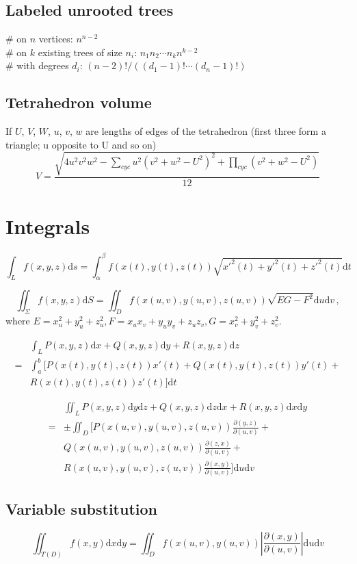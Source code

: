 	\subsection{Labeled unrooted trees}
		\# on $n$ vertices: $n^{n-2}$ \\
		\# on $k$ existing trees of size $n_i$: $n_1n_2\cdots n_k n^{k-2}$ \\
		\# with degrees $d_i$: $(n-2)! / ((d_1-1)! \cdots (d_n-1)!)$
	\subsection{Tetrahedron volume}
	If $U$, $V$, $W$, $u$, $v$, $w$ are lengths of edges of the tetrahedron (first three form a triangle; u opposite to U and so on)
	\[ V = \frac{\sqrt{ 4u^2v^2w^2 - \sum_{cyc}{u^2(v^2+w^2-U^2)^2} + \prod_{cyc}{(v^2+w^2-U^2)} }}{12} \]

\section{Integrals}
	$$\int_Lf(x,y,z)\mathrm{d}s=\int_\alpha^\beta f(x(t),y(t),z(t))\sqrt{x'^2(t)+y'^2(t)+z'^2(t)}\mathrm{d}t$$

	$$\iint_\Sigma f(x,y,z)\mathrm{d}S=\iint_D f(x(u,v),y(u,v),z(u,v))\sqrt{EG-F^2}\mathrm{d}u\mathrm{d}v\,,$$
	where $E=x_u^2+y_u^2+z_u^2,F=x_ux_v+y_uy_v+z_uz_v,G=x_v^2+y_v^2+z_v^2$.

	\begin{align*}
	&\int_L P(x,y,z)\mathrm{d}x+Q(x,y,z)\mathrm{d}y+R(x,y,z)\mathrm{d}z\\
	=&\int_a^b[P(x(t),y(t),z(t))x'(t)+Q(x(t),y(t),z(t))y'(t)+\\
	&R(x(t),y(t),z(t))z'(t)]\mathrm{d}t
	\end{align*}

	\begin{align*}
	&\iint_L P(x,y,z)\mathrm{d}y\mathrm{d}z+Q(x,y,z)\mathrm{d}z\mathrm{d}x+R(x,y,z)\mathrm{d}x\mathrm{d}y\\
	=&\pm \iint_D[P(x(u,v),y(u,v),z(u,v))\frac{\partial(y,z)}{\partial(u,v)}+\\
	&Q(x(u,v),y(u,v),z(u,v))\frac{\partial(z,x)}{\partial(u,v)}+\\
	&R(x(u,v),y(u,v),z(u,v))\frac{\partial(x,y)}{\partial(u,v)}]\mathrm{d}u\mathrm{d}v
	\end{align*}

	\subsection{Variable substitution}
	$$\iint_{T(D)}f(x,y)\mathrm{d}x\mathrm{d}y=\iint_{D}f(x(u,v),y(u,v))\left|\frac{\partial(x,y)}{\partial(u,v)}\right|\mathrm{d}u\mathrm{d}v$$
